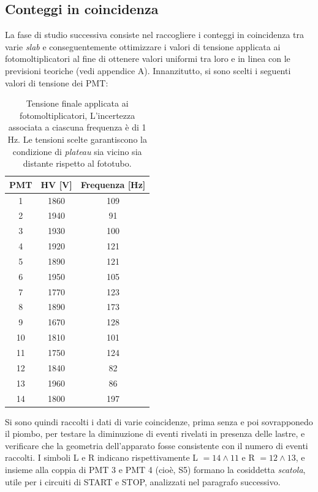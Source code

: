 \documentclass[11pt, oneside, a4paper]{article}   	%
\begin{document}
\subsection{Conteggi in coincidenza}
La fase di studio successiva consiste nel raccogliere i conteggi in coincidenza tra varie \emph{slab} e conseguentemente ottimizzare i valori di tensione applicata ai fotomoltiplicatori al fine di ottenere valori uniformi tra loro e in linea con le previsioni teoriche (vedi appendice A). 
Innanzitutto, si sono scelti i seguenti valori di tensione dei PMT: 
\begin{table}[h]
		\centering
	\begin{tabular}{ccc}
		\toprule
		PMT	&	HV [V]	&	Frequenza [Hz]\\	
		\midrule
		1	&	1860	&	109	\\
		2	&	1940	&	91	\\
		3	&	1930	&	100	\\
		4	&	1920	&	121	\\
		5	&	1890	&	121	\\
		6	&	1950	&	105	\\
		7	&	1770	&	123	\\
		8	&	1890	&	173	\\
		9	&	1670	&	128	\\
		10	&	1810	&	101	\\
		11	&	1750	&	124	\\
		12	&	1840	&	82	\\
		13	&	1960	&	86	\\
		14	&	1800	&	197	\\
		\bottomrule
	\end{tabular}
	\caption{Tensione finale applicata ai fotomoltiplicatori, L'incertezza associata a ciascuna frequenza è di 1 Hz. Le tensioni scelte garantiscono la condizione di \emph{plateau} sia vicino sia distante rispetto al fototubo.}
	\label{HV_counts}
\end{table}
Si sono quindi raccolti i dati di varie coincidenze, prima senza e poi sovrapponedo il piombo, per testare la diminuzione di eventi rivelati in presenza delle lastre, e verificare che la geometria dell'apparato fosse consistente con il numero di eventi raccolti. I simboli L e R indicano rispettivamente L $= 14 \wedge 11 $ e R $= 12 \wedge 13$, e insieme alla coppia di PMT 3 e PMT 4 (cioè, S5) formano la cosiddetta \emph{scatola}, utile per i circuiti di START e STOP, analizzati nel paragrafo successivo.
%
\end{document}

